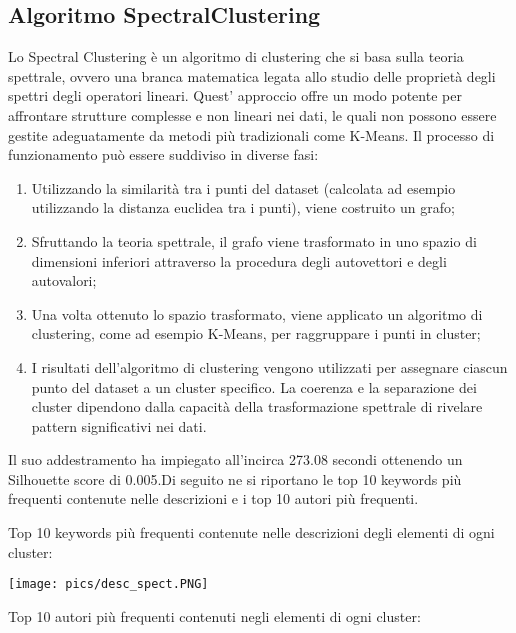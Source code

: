 \documentclass[12pt,oneside]{article}
\begin{document}
    \begin{enumerate}
    \subsection{Algoritmo SpectralClustering}
    \begin{justify}
    Lo Spectral Clustering è un algoritmo di clustering che si basa sulla teoria spettrale, ovvero una branca matematica legata allo studio delle proprietà degli spettri degli operatori lineari. Quest' approccio offre un modo potente per affrontare strutture complesse e non lineari nei dati, le quali non possono essere gestite adeguatamente da metodi più tradizionali come K-Means. 
    Il processo di funzionamento può essere suddiviso in diverse fasi:
    \begin{enumerate}[label=\arabic*)]
        \item Utilizzando la similarità tra i punti del dataset (calcolata ad esempio utilizzando la distanza euclidea tra i punti), viene costruito un grafo;
        \item Sfruttando la teoria spettrale, il grafo viene trasformato in uno spazio di dimensioni inferiori attraverso la procedura degli autovettori e degli autovalori;
        \item Una volta ottenuto lo spazio trasformato, viene applicato un algoritmo di clustering, come ad esempio K-Means, per raggruppare i punti in cluster;
        \item I risultati dell'algoritmo di clustering vengono utilizzati per assegnare ciascun punto del dataset a un cluster specifico. La coerenza e la separazione dei cluster dipendono dalla capacità della trasformazione spettrale di rivelare pattern significativi nei dati.
    \end{enumerate}
    Il suo addestramento ha impiegato all’incirca 273.08 secondi ottenendo un Silhouette score di 0.005.Di seguito ne si riportano le top 10 keywords più frequenti contenute nelle descrizioni e i top 10 autori più frequenti.
    \end{justify}

    \hfill
    
    \begin{justify}
    Top 10 keywords più frequenti contenute nelle descrizioni degli elementi di ogni cluster:
    \end{justify}

    \texttt{[image: pics/desc\_spect.PNG]}
    
    \begin{justify}
    Top 10 autori più frequenti contenuti negli elementi di ogni cluster:
    \end{justify}


\end{enumerate}
\end{document}
